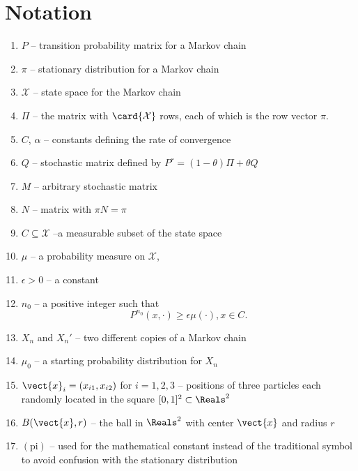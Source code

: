 \documentclass[12pt]{article}
\begin{document}
\section*{Notation}
\begin{enumerate}
    \item
        \( P \) -- transition probability matrix for a Markov chain
    \item
        \( \pi \) -- stationary distribution for a Markov chain
    \item
        \( \mathcal{X} \) -- state space for the Markov chain
    \item
        \( \Pi \) -- the matrix with \( \card{\mathcal{X}} \) rows, each
        of which is the row vector \( \pi \).
    \item
        \( C \), \( \alpha \) -- constants defining the rate of
        convergence
    \item
        \( Q \) -- stochastic matrix defined by \( P^r = (1 - \theta)\Pi
        + \theta Q \)
    \item
        \( M \) -- arbitrary stochastic matrix
    \item
        \( N \) -- matrix with \( \pi N = \pi \)
    \item
        \( C \subseteq \mathcal{X} \) --a measurable subset of the state
        space
    \item
        \( \mu \) -- a probability measure on \( \mathcal{X} \),
    \item
        \( \epsilon > 0 \) -- a constant
    \item
        \( n_0 \) -- a positive integer such that
        \[
            P^{n_0} (x, \cdot) \ge \epsilon \mu(\cdot), x \in C.
        \]
    \item
        \( X_n \) and \( X_n' \) -- two different copies of a Markov
        chain
    \item
        \( \mu_0 \) -- a starting probability distribution for \( X_n \)
    \item
        \( \vect{x}_i = (x_{i1}, x_{i2}) \) for \( i = 1,2,3 \) --
        positions of three particles each randomly located in the square
        \( [0,1]^2 \subset \Reals^2 \)
    \item
        \( B(\vect{x}, r) \) -- the ball in \( \Reals^2 \) with center \(
        \vect{x} \) and radius \( r \)
    \item
        \( (\text{pi}) \) -- used for the mathematical constant instead
        of the traditional symbol to avoid confusion with the stationary
        distribution

\end{enumerate}
\end{document}
